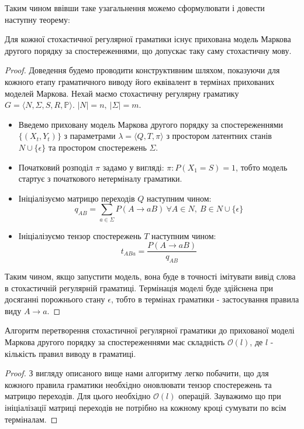 Таким чином ввівши таке узагальнення можемо сформулювати і довести наступну теорему:
\begin{theorem}
  Для кожної стохастичної регулярної граматики існує прихована модель Маркова другого порядку за спостереженнями, що допускає таку саму стохастичну мову.
\end{theorem}
\begin{proof}
Доведення будемо проводити конструктивним шляхом, показуючи для кожного етапу граматичного виводу його еквівалент в термінах прихованих моделей Маркова.
Нехай маємо стохастичну регулярну граматику $ G = \big\langle N, \Sigma, S, R, \mathbb{P}\big\rangle $. $|N| = n,\ |\Sigma| = m $.
\begin{itemize}
  \item Введемо приховану модель Маркова другого порядку за спостереженнями $ \{ (X_t, Y_t) \} $ з параметрами $\lambda = \big\langle Q, T, \pi \big\rangle$ з простором латентних станів $N \cup \{ \epsilon \}$ та простором спостережень $\Sigma$.
  \item Початковий розподіл $\pi$ задамо у вигляді: $ \pi \colon P(X_1 = S) = 1 $, тобто модель стартує з початкового нетерміналу граматики.
  \item Ініціалізуємо матрицю переходів $Q$ наступним чином:
  $$ q_{AB} = \sum_{a \in \Sigma} P(A \rightarrow a B) \ \forall A \in N,\ B \in N \cup \{ \epsilon \} $$
  \item Ініціалізуємо тензор спостережень $T$ наступним чином:
  $$ t_{ABa} = \frac{P(A \rightarrow a B)}{q_{AB}} $$
\end{itemize}
Таким чином, якщо запустити модель, вона буде в точності імітувати вивід слова в стохастичній регулярній граматиці. Термінація моделі буде здійснена при досяганні порожнього стану $\epsilon$, тобто в термінах граматики - застосування правила виду $ A \rightarrow a $.
\end{proof}
\begin{claim}
  Алгоритм перетворення стохастичної регулярної граматики до прихованої моделі Маркова другого порядку за спостереженнями має складність $\mathcal{O}(l)$, де $l$ - кількість правил виводу в граматиці.
\end{claim}
\begin{proof}
  З вигляду описаного вище нами алгоритму легко побачити, що для кожного правила граматики необхідно оновлювати тензор спостережень та матрицю переходів. Для цього необхідно $\mathcal{O}(l)$ операцій. Зауважимо що при ініціалізації матриці переходів не потрібно на кожному кроці сумувати по всім терміналам.
\end{proof}

